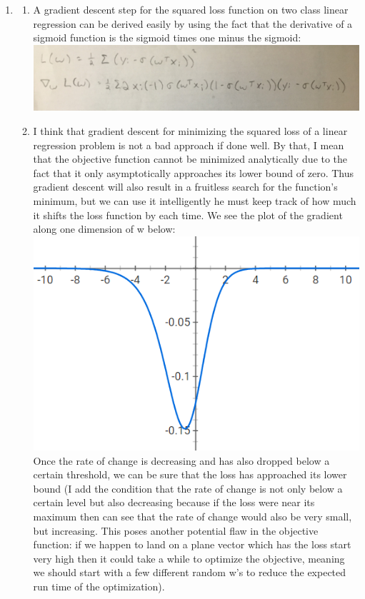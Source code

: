 \documentclass{article}
\begin{document}
\begin{enumerate}
\begin{enumerate}
\end{enumerate}
\item 
\begin{enumerate} 
\item A gradient descent step for the squared loss function on two class linear regression can be derived easily by using the fact that the derivative of a sigmoid function is the sigmoid times one minus the sigmoid: \\
\includegraphics[scale=.05]{IMG_3687.JPG}\\

\item I think that gradient descent for minimizing the squared loss of a linear regression problem is not a bad approach if done well. By that, I mean that the objective function cannot be minimized analytically due to the fact that it only asymptotically approaches its lower bound of zero. Thus gradient descent will also result in a fruitless search for the function's minimum, but we can use it intelligently he must keep track of how much it shifts the loss function by each time. We see the plot of the gradient along one dimension of w below:\\
\includegraphics[scale=.8]{23b.PNG}
\\
Once the rate of change is decreasing and has also dropped below a certain threshold, we can be sure that the loss has approached its lower bound (I add the condition that the rate of change is not only below a certain level but also decreasing because if the loss were near its maximum then can see that the rate of change would also be very small, but increasing. This poses another potential flaw in the objective function: if we happen to land on a plane vector which has the loss start very high then it could take a while to optimize the objective, meaning we should start with a few different random w's to reduce the expected run time of the optimization). 
\end{enumerate}

\end{enumerate}
\end{document}
